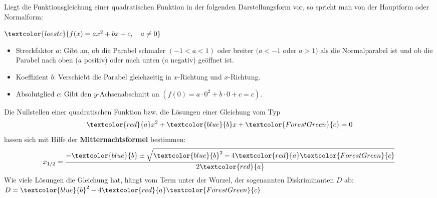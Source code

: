 Liegt die Funktionsgleichung einer quadratischen Funktion in der folgenden Darstellungsform vor, so spricht man von der Hauptform oder Normalform:
\begin{tcolorbox}\centering
	$\textcolor{loestc}{f(x)=ax^2+bx+c, \quad a\neq 0}$
\end{tcolorbox}
\begin{itemize}
	\item Streckfaktor $a$: \textcolor{loes}{Gibt an, ob die Parabel schmaler $\left(-1<a<1\right)$ oder breiter  $(a<-1$ oder $a>1)$ als die Normalparabel ist und ob die Parabel nach oben ($a$ positiv) oder nach unten ($a$ negativ) geöffnet ist.}\vspace{0.6cm}
	\item Koeffizient $b$: \textcolor{loes}{Verschiebt die Parabel gleichzeitig in $x$-Richtung und $x$-Richtung.}\vspace{0.6cm}
	\item Absolutglied $c$: \textcolor{loes}{Gibt den $y$-Achsenabschnitt an $\left(f(0)=a\cdot 0^2+b\cdot 0+c=c\right)$.}\vspace{0.6cm}
\end{itemize}
Die Nullstellen einer quadratischen Funktion bzw. die Lösungen einer Gleichung vom Typ \[{\textcolor{red}{a}x^2+\textcolor{blue}{b}x+\textcolor{ForestGreen}{c}=0}\] lassen sich mit Hilfe der \textbf{Mitternachtsformel}  bestimmen:
\begin{align*}
	x_{1/2}=\frac{-\textcolor{blue}{b}\pm\sqrt{\textcolor{blue}{b}^2-4 \textcolor{red}{a}  \textcolor{ForestGreen}{c}}}{2 \textcolor{red}{a}}
\end{align*}
Wie viele Lösungen die Gleichung hat, hängt vom Term unter der Wurzel, der sogenannten Diskriminanten \(D\) ab:
\(D=\textcolor{blue}{b}^2-4 \textcolor{red}{a}  \textcolor{ForestGreen}{c}\)\\ \\
